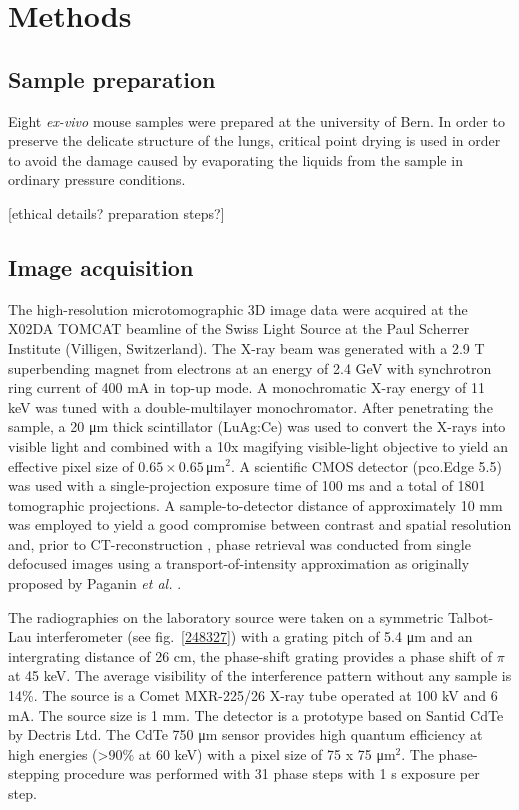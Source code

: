 \section{Methods}\label{sec:methods}
\subsection{Sample preparation}
Eight \emph{ex-vivo} mouse samples were prepared at the university of Bern.
In order to preserve the delicate structure of the lungs, critical point
drying is used in order to avoid the damage caused by evaporating the liquids
from the sample in ordinary pressure conditions.

[ethical details? preparation steps?]

\subsection{Image acquisition}\label{sec:acquisition}
The high-resolution microtomographic 3D image data were acquired at the X02DA TOMCAT beamline of the Swiss Light Source at the Paul Scherrer Institute (Villigen, Switzerland). The X-ray beam was generated with a 2.9 T superbending magnet from electrons at an energy of 2.4 GeV with synchrotron ring current of 400 mA in top-up mode. A monochromatic X-ray energy of 11 keV was tuned with a double-multilayer monochromator. After penetrating the sample, a 20 μm thick scintillator (LuAg:Ce) was used to convert the X-rays into visible light and combined with a 10x magifying visible-light objective to yield an effective pixel size of $0.65 \times 0.65\,$μm$^2$. A scientific CMOS detector (pco.Edge 5.5) was used with a single-projection exposure time of 100 ms and a total of 1801 tomographic projections. A sample-to-detector distance of approximately 10 mm was employed to yield a good compromise between contrast and spatial resolution and, prior to CT-reconstruction \cite{Marone2012}, phase retrieval was conducted from single defocused images using a transport-of-intensity approximation as originally proposed by Paganin \textit{et al.} \cite{Paganin2002}. 

The radiographies on the laboratory source were taken on a symmetric
Talbot-Lau interferometer (see fig.~\ref{248327}) with a grating pitch of 5.4 μm and an intergrating
distance of 26 cm, the phase-shift grating provides a phase shift of $\pi$
at 45 keV. The average visibility of the interference pattern without any
sample is 14\%. The source is a Comet MXR-225/26 X-ray tube operated at 100
kV and 6 mA. The source size is 1 mm. The detector is a prototype based on
Santid CdTe by Dectris Ltd. The CdTe 750 μm sensor provides high quantum
efficiency at high energies (>90\% at 60 keV) with a pixel size of 75 x 75
μm$^2$. The phase-stepping procedure was performed with 31 phase steps with
1 s exposure per step.

